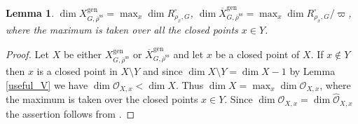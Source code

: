 \documentclass{amsart}
\newtheorem{lem}[prop]{Lemma}
\theoremstyle{definition}
\theoremstyle{remark}
\newcommand{\OO}{\mathcal O}
\newcommand{\rhobar}{\overline{\rho}}
\newcommand{\gen}{\mathrm{gen}}
\newcommand{\Xbar}{\overline{X}}
\newcommand{\rhobarss}{\rhobar^{\mathrm{ss}}}
\begin{document}
\begin{lem}\label{dim_closed_pts} 
$\dim X^{\gen}_{G,\rhobarss}= \max_{x} \dim R^{\square}_{\rho_x, G}$,
$\dim \Xbar^{\gen}_{G,\rhobarss}=  \max_{x} \dim R^{\square}_{\rho_x, G}/\varpi$, 
where the maximum is taken over all the closed points $x\in Y$. 
\end{lem}
\begin{proof} Let $X$ be either $X^{\gen}_{G,\rhobarss}$ or $\Xbar^{\gen}_{G,\rhobarss}$
and let $x$ be a closed point of $X$. If 
$x\not\in Y$ then $x$ is a closed point in $X\setminus Y$ and 
since $\dim X\setminus Y = \dim X -1$ by Lemma \ref{useful_V} 
we have $\dim \OO_{X,x}< \dim X$. Thus $\dim X= \max_{x} \dim \OO_{X,x}$, 
where the maximum is taken over the closed points $x\in Y$. Since  $\dim \OO_{X,x} = \dim \hat{\OO}_{X,x}$ the assertion 
follows from . 
\end{proof} 
\end{document}
